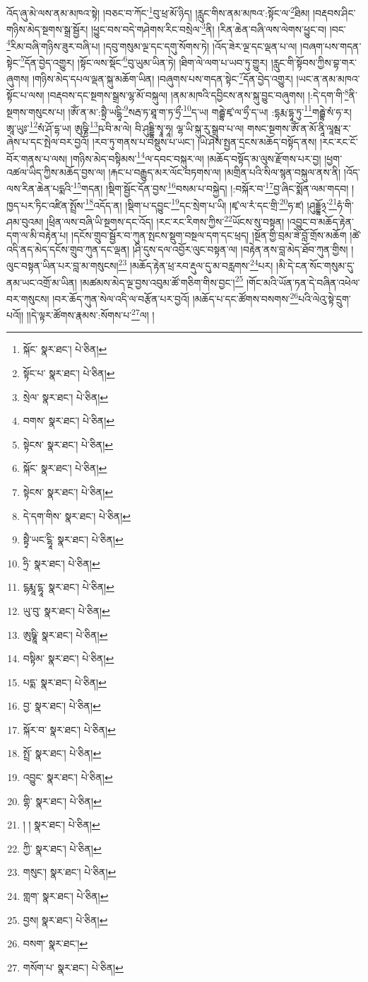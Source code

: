 འོད་ཞུ་མེ་ལས་ནམ་མཁའ་སྟེ། །བཅང་བ་ཀོང་\footnote{སྐོང་  སྣར་ཐང་།  པེ་ཅིན། }བུ་ཕྲ་མོ་ཉིད། །རླུང་གིས་ནམ་མཁའ་:སྟོང་ལ་\footnote{སྟོང་པ་  སྣར་ཐང་།  པེ་ཅིན། }ཐིམ། །བརྡབས་ཤིང་གཉིས་མེད་སྔགས་སྒྲ་སྦྱོར། །ཕྱུང་བས་བདེ་གཤེགས་རིང་བསྲེལ་\footnote{སྲེལ་  སྣར་ཐང་།  པེ་ཅིན། }ནི། །རིན་ཆེན་བཞི་ལས་ལེགས་ཕྱུང་བ། །བང་\footnote{བགས་  སྣར་ཐང་།  པེ་ཅིན། }རིམ་བཞི་གཉིས་ཟུར་བཞི་པ། །དབུ་གསུམ་ལྔ་དང་དགུ་སོགས་ཏེ། །འོད་ཟེར་ལྔ་དང་ལྡན་པ་ལ། །བཞག་པས་གདན་སྟེང་\footnote{སྟེངས་  སྣར་ཐང་།  པེ་ཅིན། }དོན་བྱེད་འགྱུར། །སྟོང་ལས་སྡོང་\footnote{སྐོང་  སྣར་ཐང་།  པེ་ཅིན། }བུ་ཡུམ་ཡིན་ཏེ། །ཐིག་ལེ་ལག་པ་ཡབ་ཏུ་གྱུར། །རླུང་གི་སྟོབས་ཀྱིས་བྷ་གར་ཞུགས། །གཉིས་མེད་དཔལ་ལྡན་སྐུ་མཆོག་ཡིན། །བཞུགས་པས་གདན་སྟེང་\footnote{སྟེངས་  སྣར་ཐང་།  པེ་ཅིན། }དོན་བྱེད་འགྱུར། །ཡང་ན་ནམ་མཁའ་སྟོང་པ་ལས། །བརྡབས་དང་སྔགས་སྒྲས་ལྷ་མོ་བསྐུལ། །ནམ་མཁའི་དབྱིངས་ནས་སྐུ་བྱུང་བཞུགས། །:དེ་དག་གི་\footnote{དེ་དག་གིས་  སྣར་ཐང་།  པེ་ཅིན། }ནི་སྔགས་གསུངས་པ། །ཨོཾ་ན་མ་:སྟྲཻ་ཡངྷྭི་\footnote{སྟྭཻ་ཡང་ངྷཱི་  སྣར་ཐང་།  པེ་ཅིན། }སརྦ་ཏ་ཐཱ་ག་ཏ་ཧྲྀ་\footnote{ཧྲི་  སྣར་ཐང་།  པེ་ཅིན། }ད་ཡ། གརྦྷེ་ཛྭ་ལ་ཧྲྀ་ད་ཡ། :དྷརྨ་དྷཱ་ཏུ་\footnote{ངྷརྨཱ་ངྷཱ་  སྣར་ཐང་།  པེ་ཅིན། }གརྦྷེ་སཾ་ཧ་ར། ཨཱ་ཡུཿ་\footnote{ཡུ་བུ་  སྣར་ཐང་།  པེ་ཅིན། }སཾ་ཤོ་དྷ་ཡ། ཨུཥྞི་\footnote{ཨུཥྞཱི་  སྣར་ཐང་།  པེ་ཅིན། }ཥ་བི་མ་ལེ། བི་ཤུདྡྷི་སྭཱ་ཧཱ། ལྷ་ཡི་སྐུ་རུ་སྒྲུབ་པ་ལ། གསང་སྔགས་ཨོཾ་ན་མོ་ནཱི་ལཱམྦ་ར་ཞེས་པ་དང་སྤེལ་བར་བྱའོ། །རབ་ཏུ་གནས་པ་བསྡུས་པ་ཡང་། །ཡེ་ཤེས་སྤྱན་དྲངས་མཆོད་བསྟོད་ནས། །རང་རང་ངོ་བོར་གནས་པ་ལས། །གཉིས་མེད་བསྟིམས་\footnote{བསྟིམ་  སྣར་ཐང་།  པེ་ཅིན། }ལ་དབང་བསྐུར་ལ། །མཆོད་བསྟོད་མ་ལུས་རྫོགས་པར་བྱ། །ཕྱག་འཚལ་ཡིད་ཀྱིས་མཆོད་བྱས་ལ། །རྐང་པ་བརྒྱུད་མར་ལོང་བཏགས་ལ། །མགྲིན་པའི་སིལ་སྙན་བསྐུལ་ནས་ནི། །འོད་ལས་རིན་ཆེན་པདྨའི་\footnote{པདྨ་  སྣར་ཐང་།  པེ་ཅིན། }གདན། །སྡིག་སྦྱོང་དོན་བྱས་\footnote{བྱ་  སྣར་ཐང་།  པེ་ཅིན། }བསམ་པ་བསྐྱེད། །:བསྐོར་བ་\footnote{སྐོར་བ་  སྣར་ཐང་།  པེ་ཅིན། }བྱ་ཞིང་སྨོན་ལམ་གདབ། །ཁྱད་པར་ཏིང་འཛིན་སྤྲོས་\footnote{སྤྲོ་  སྣར་ཐང་།  པེ་ཅིན། }འདོད་ན། །སྡིག་པ་དབྱུང་\footnote{འབྱུང་  སྣར་ཐང་།  པེ་ཅིན། }དང་སྲེག་པ་ཡི། །ཛྭ་ལ་རཾ་དང་གྲི་\footnote{གྷི་  སྣར་ཐང་།  པེ་ཅིན། }ཧ་ཛ། །ཤུདྡྷོ྅་\footnote{། །  སྣར་ཐང་།  པེ་ཅིན། }ཧཾ་གི་ཤམ་བུའམ། །ཕྲིན་ལས་བཞི་ཡི་སྔགས་དང་འོད། །རང་རང་རིགས་ཀྱིས་\footnote{ཀྱི་  སྣར་ཐང་།  པེ་ཅིན། }ཡོངས་སུ་བསྟན། །འབྱུང་བ་མཆོད་རྟེན་དག་ལ་མི་བརྟེན་པ། །དངོས་གྲུབ་སྦྱོར་བ་ཀུན་སྤངས་སྡུག་བསྔལ་དག་དང་ཕྲད། །སྔོན་གྱི་བྲམ་ཟེ་བློ་གྲོས་མཆོག །ཚེ་འདི་ནད་མེད་དངོས་གྲུབ་ཀུན་དང་ལྡན། །ཤི་དུས་དལ་འབྱོར་ལུང་བསྟན་ལ། །བརྟེན་ནས་བླ་མེད་ཐོབ་ཀུན་གྱིས། །ལུང་བསྟན་ཡིན་པར་བླ་མ་གསུངས།\footnote{གསུང་།  སྣར་ཐང་།  པེ་ཅིན། } །མཆོད་རྟེན་ཕྲ་རབ་རྡུལ་དུ་མ་བརླགས་\footnote{གླག་  སྣར་ཐང་།  པེ་ཅིན། }པར། །མི་དེ་ངན་སོང་གསུམ་དུ་ནམ་ཡང་འགྲོ་མ་ཡིན། །མཚམས་མེད་ལྔ་བྱས་འབུམ་ཚོ་གཅིག་གིས་བྱང་།\footnote{བྱས།  སྣར་ཐང་།  པེ་ཅིན། } །གོང་མའི་ཡོན་ཏན་དེ་བཞིན་འཕེལ་བར་གསུངས། །བར་ཆོད་ཀུན་སེལ་འདི་ལ་བརྩོན་པར་བྱའོ། །མཆོད་པ་དང་ཚོགས་བསགས་\footnote{བསག་  སྣར་ཐང་། }པའི་ལེའུ་སྟེ་དྲུག་པའོ།། །།དེ་ལྟར་ཚོགས་རྣམས་:སོགས་པ་\footnote{གསོག་པ་  སྣར་ཐང་།  པེ་ཅིན། }ལ། །

